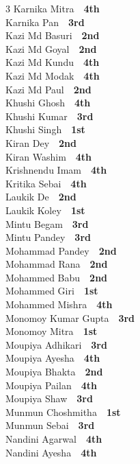 \documentclass[11pt,a4paper]{article}
\begin{document}
\begin{multicols}{3}
Karnika Mitra~\dotfill~\textbf{4th}\\
Karnika Pan~\dotfill~\textbf{3rd}\\
Kazi Md Basuri~\dotfill~\textbf{2nd}\\
Kazi Md Goyal~\dotfill~\textbf{2nd}\\
Kazi Md Kundu~\dotfill~\textbf{4th}\\
Kazi Md Modak~\dotfill~\textbf{4th}\\
Kazi Md Paul~\dotfill~\textbf{2nd}\\
Khushi Ghosh~\dotfill~\textbf{4th}\\
Khushi Kumar~\dotfill~\textbf{3rd}\\
Khushi Singh~\dotfill~\textbf{1st}\\
Kiran Dey~\dotfill~\textbf{2nd}\\
Kiran Washim~\dotfill~\textbf{4th}\\
Krishnendu Imam~\dotfill~\textbf{4th}\\
Kritika Sebai~\dotfill~\textbf{4th}\\
Laukik De~\dotfill~\textbf{2nd}\\
Laukik Koley~\dotfill~\textbf{1st}\\
Mintu Begam~\dotfill~\textbf{3rd}\\
Mintu Pandey~\dotfill~\textbf{3rd}\\
Mohammad Pandey~\dotfill~\textbf{2nd}\\
Mohammad Rana~\dotfill~\textbf{2nd}\\
Mohammed Babu~\dotfill~\textbf{2nd}\\
Mohammed Giri~\dotfill~\textbf{1st}\\
Mohammed Mishra~\dotfill~\textbf{4th}\\
Monomoy Kumar Gupta~\dotfill~\textbf{3rd}\\
Monomoy Mitra~\dotfill~\textbf{1st}\\
Moupiya Adhikari~\dotfill~\textbf{3rd}\\
Moupiya Ayesha~\dotfill~\textbf{4th}\\
Moupiya Bhakta~\dotfill~\textbf{2nd}\\
Moupiya Pailan~\dotfill~\textbf{4th}\\
Moupiya Shaw~\dotfill~\textbf{3rd}\\
Munmun Choshmitha~\dotfill~\textbf{1st}\\
Munmun Sebai~\dotfill~\textbf{3rd}\\
Nandini Agarwal~\dotfill~\textbf{4th}\\
Nandini Ayesha~\dotfill~\textbf{4th}\\

\end{multicols}
\end{document}
